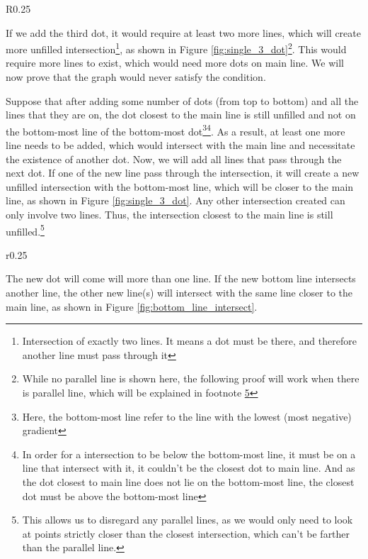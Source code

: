 \documentclass[a4paper, 12pt]{article}
\begin{document}
\begin{wrapfigure}{R}{0.25\textwidth}
    \vspace{-2cm}
    
    \caption{Trying to fill the unfilled intersection. Note the new intersection in closer to the main line}
    \label{fig:single_3_dot}
    \vspace{-1\baselineskip}
\end{wrapfigure}
If we add the third dot, it would require at least two more lines, which will create more unfilled intersection\footnote{Intersection of exactly two lines. It means a dot must be there, and therefore another line must pass through it}, as shown in Figure \ref{fig:single_3_dot}\footnote{While no parallel line is shown here, the following proof will work when there is parallel line, which will be explained in footnote \ref{footnote_para_1}}. This would require more lines to exist, which would need more dots on main line. We will now prove that the graph would never satisfy the condition.

Suppose that after adding some number of dots (from top to bottom) and all the lines that they are on, the dot closest to the main line is still unfilled and not on the bottom-most line of the bottom-most dot\footnote{Here, the bottom-most line refer to the line with the lowest (most negative) gradient}\footnote{In order for a intersection to be below the bottom-most line, it must be on a line that intersect with it, it couldn't be the closest dot to main line. And as the dot closest to main line does not lie on the bottom-most line, the closest dot must be above the bottom-most line}. As a result, at least one more line needs to be added, which would intersect with the main line and necessitate the existence of another dot. Now, we will add all lines that pass through the next dot. If one of the new line pass through the intersection, it will create a new unfilled intersection with the bottom-most line, which will be closer to the main line, as shown in Figure \ref{fig:single_3_dot}. Any other intersection created can only involve two lines. Thus, the intersection closest to the main line is still unfilled.\footnote{This allows us to disregard any parallel lines, as we would only need to look at points strictly closer than the closest intersection, which can't be farther than the parallel line.\label{footnote_para_1}}

\begin{wrapfigure}{r}{0.25\textwidth}
    \vspace{-1\baselineskip}
    
    \caption{If the bottom line intersect with another line.}
    \label{fig:bottom_line_intersect}
\end{wrapfigure}
The new dot will come will more than one line. If the new bottom line intersects another line, the other new line(s) will intersect with the same line closer to the main line, as shown in Figure \ref{fig:bottom_line_intersect}.
\end{document}
